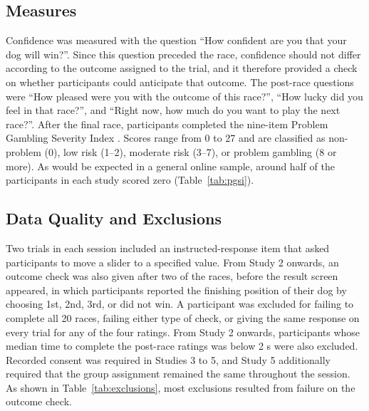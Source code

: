 \documentclass[man,floatsintext,donotrepeattitle]{apa7}
\begin{document}
\subsection{Measures}
Confidence was measured with the question ``How confident are you that your dog will win?''. Since this question preceded the race, confidence should not differ according to the outcome assigned to the trial, and it therefore provided a check on whether participants could anticipate that outcome.
The post-race questions were ``How pleased were you with the outcome of this race?'', ``How lucky did you feel in that race?'', and ``Right now, how much do you want to play the next race?''.
After the final race, participants completed the nine-item Problem Gambling Severity Index \parencite[PGSI;][]{ferriswynne2001}. Scores range from 0 to 27 and are classified as non-problem (0), low risk (1--2), moderate risk (3--7), or problem gambling (8 or more). As would be expected in a
general online sample, around half of the participants in each study scored zero
(Table~\ref{tab:pgsi}).

\subsection{Data Quality and Exclusions}
Two trials in each session included an instructed-response item that asked participants to move a
slider to a specified value. From Study 2 onwards, an outcome check was also given after two of the
races, before the result screen appeared, in which participants reported the finishing position of
their dog by choosing 1st, 2nd, 3rd, or did not win. A participant was excluded for failing to
complete all 20 races, failing either type of check, or giving the same response on every trial for
any of the four ratings. From Study 2 onwards, participants whose median time to complete the
post-race ratings was below 2 s were also excluded. Recorded consent was required in Studies 3 to 5,
and Study 5 additionally required that the group assignment remained the same throughout the
session. As shown in Table~\ref{tab:exclusions}, most exclusions resulted from failure on the outcome
check.

\begin{table}[htbp]
\caption{Completed Sessions, Exclusions, and Analyzed Participants}
\label{tab:exclusions}

\par{}
\end{table}
\end{document}
